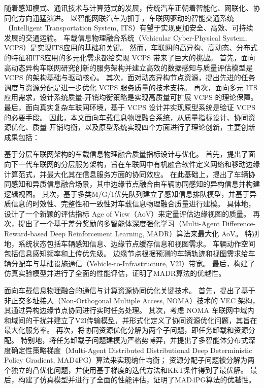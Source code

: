 \begin{cabstract}	%

随着感知模式、通讯技术与计算范式的发展，传统汽车正朝着智能化、网联化、协同化方向迅猛演进。
以智能网联汽车为抓手，车联网驱动的智能交通系统（Intelligent Transportation System, ITS）有望于实现更加安全、高效、可持续发展的交通运输。
车载信息物理融合系统（Vehicular Cyber-Physical System, VCPS）是实现ITS应用的基础和关键。
然而，车联网的高异构、高动态、分布式的特征和ITS应用的多元化需求都给实现 VCPS 带来了巨大的挑战。
首先，面向高动态异构车联网研究创新的服务架构并建立高效的数据感知与质量评估模型是 VCPS 的架构基础与驱动核心。
其次，面对动态异构节点资源，提出先进的任务调度与资源分配是进一步优化 VCPS 服务质量的技术支持。
再次，面向多元 ITS 应用需求，设计系统质量-开销均衡策略是实现高质量可扩展 VCPS 的理论保障。
最后，面向真实复杂车联网环境，基于 VCPS 设计并实现原型系统是验证 VCPS 的必要手段。
因此，本文面向车载信息物理融合系统，从质量指标设计、协同资源优化、质量-开销均衡，以及原型系统实现四个方面进行了理论创新，主要创新成果包括：

 基于分层车联网架构的车载信息物理融合质量指标设计与优化。
首先，提出了面向下一代车联网的分层服务架构，旨在车联网中有机融合软件定义网络和移动边缘计算范式，并最大化其在信息服务方面的协同效应。
在此基础上，提出了车辆协同感知和异质信息融合场景，其中边缘节点融合由车辆协同感知的异构信息并构建逻辑视图。
其次，基于多类M/G/1优先队列建立了感知信息排队模型，并基于异质信息的时效性、完整性和一致性对车载信息物理融合质量进行建模。
具体地，设计了一个新颖的评估指标 Age of View（AoV）来定量评估边缘视图的质量。 
再次，提出了一个基于差分奖励的多智能体深度强化学习（Multi-Agent Difference-Reward-based Deep Reinforcement Learning, MADR）算法来最大化 AoV。
特别地，系统状态包括车辆感知信息、边缘节点缓存信息和视图需求。
车辆动作空间包括信息感知频率和上传优先级。
边缘节点根据预测的车辆轨迹和视图需求给车辆分配车与基础设施通信（Vehicle-to-Infrastructure, V2I）带宽。
最后，构建了仿真实验模型并进行了全面的性能评估，证明了MADR算法的优越性。

 面向车载信息物理融合的通信与计算资源协同优化关键技术。
首先，提出了基于非正交多址接入（Non-Orthogonal Multiple Access, NOMA）技术的 VEC 架构，其通过异构边缘节点协同进行实时任务处理。
其次，考虑 NOMA 车联网中域内和域间的干扰并建立了V2I传输模型，并形式化定义了协同资源优化问题，其旨在最大化服务率。
再次，将协同资源优化分解为两个子问题，即任务卸载和资源分配。
特别地，将任务卸载子问题建模为严格势博弈，并提出了多智能体分布式深度确定性策略梯度（Multi-Agent Distributed Distributional Deep Deterministic Policy Gradient, MAD4PG）算法来实现纳什均衡；
资源分配子问题被分解为两个独立的凸优化问题，并使用基于梯度的迭代方法和KKT条件得到了最优解。
最后，构建了仿真模型并进行了全面的性能评估，证明了MAD4PG算法的优越性。


\end{cabstract}

